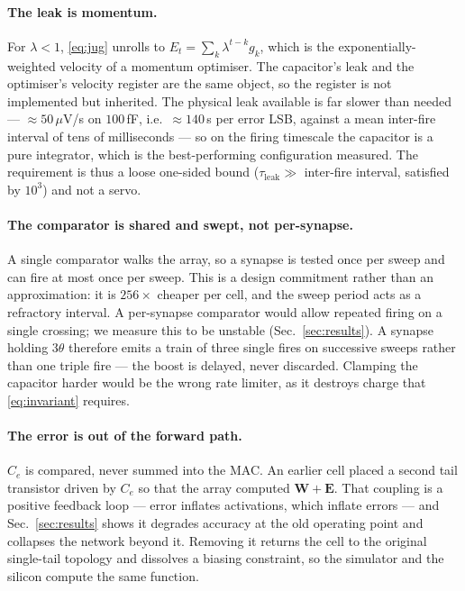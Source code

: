 \documentclass[11pt]{article}
\newcommand{\W}{\bm W}
\newcommand{\E}{\bm E}
\begin{document}
\paragraph{The leak is momentum.} For $\lambda < 1$, \eqref{eq:jug} unrolls to $E_t = \sum_k
\lambda^{t-k} g_k$, which is the exponentially-weighted velocity of a momentum optimiser. The
capacitor's leak and the optimiser's velocity register are the same object, so the register is not
implemented but inherited. The physical leak available is far slower than needed --- $\approx
50\,\mu$V/s on $100$\,fF, i.e.\ $\approx 140$\,s per error LSB, against a mean inter-fire interval of
tens of milliseconds --- so on the firing timescale the capacitor is a pure integrator, which is the
best-performing configuration measured. The requirement is thus a loose one-sided bound ($\tau_{\text{leak}}
\gg$ inter-fire interval, satisfied by $10^3$) and not a servo.

\paragraph{The comparator is shared and swept, not per-synapse.} A single comparator walks the array,
so a synapse is tested once per sweep and can fire at most once per sweep. This is a design commitment
rather than an approximation: it is $256\times$ cheaper per cell, and the sweep period acts as a
refractory interval. A per-synapse comparator would allow repeated firing on a single crossing; we
measure this to be unstable (Sec.~\ref{sec:results}). A synapse holding $3\theta$ therefore emits a
train of three single fires on successive sweeps rather than one triple fire --- the boost is delayed,
never discarded. Clamping the capacitor harder would be the wrong rate limiter, as it destroys charge
that \eqref{eq:invariant} requires.

\paragraph{The error is out of the forward path.} $C_e$ is compared, never summed into the MAC. An
earlier cell placed a second tail transistor driven by $C_e$ so that the array computed $\W + \E$.
That coupling is a positive feedback loop --- error inflates activations, which inflate errors --- and
Sec.~\ref{sec:results} shows it degrades accuracy at the old operating point and collapses the network
beyond it. Removing it returns the cell to the original single-tail topology and dissolves a biasing
constraint, so the simulator and the silicon compute the same function.
\end{document}
